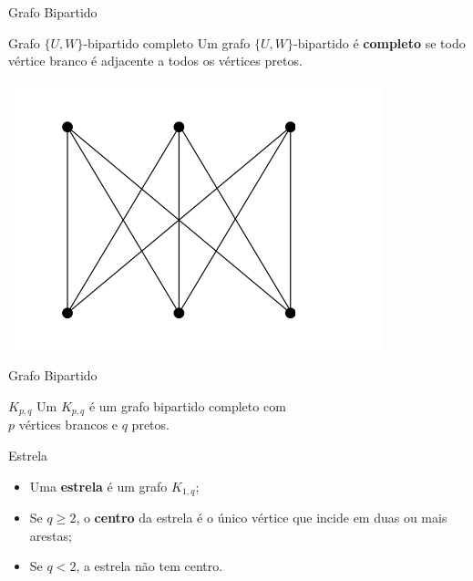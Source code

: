 \documentclass[xcolor=dvipsnames,table]{beamer}
\begin{document}
	\begin{frame}{Grafo Bipartido}
		\begin{block}{Grafo $\{ U, W \}$-bipartido completo}
			Um grafo $\{U, W \}$-bipartido é {\bf completo} se todo vértice branco é adjacente a todos os vértices pretos. 
		\end{block} \pause
		\begin{center}
			\includegraphics[width=.6\textwidth]{images/bipartido-completo.png}
		\end{center}
	\end{frame}
	
	\begin{frame}{Grafo Bipartido}
		\begin{block}{$K_{p,q}$}
			Um $K_{p,q}$ é um grafo bipartido completo com \\$p$ vértices brancos e $q$ pretos.
		\end{block} \pause
		\begin{block}{Estrela}
			\begin{itemize}
				\item Uma {\bf estrela} é um grafo $K_{1,q}$; \pause
				\item Se $q \geq 2$, o {\bf centro} da estrela é o único vértice que incide em duas ou mais arestas; \pause
				\item Se $q < 2$, a estrela não tem centro.
			\end{itemize}
		\end{block}
	\end{frame}
	
	\begin{frame}
		\titlepage
	\end{frame}
	
\end{document}
